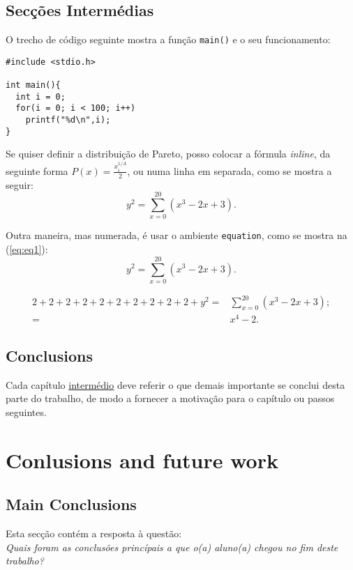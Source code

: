 \documentclass[titlepage,12pt,a4paper,times]{book}
\begin{document}
\section{Secções Intermédias}
\label{chap4:sec:...}

O trecho de código seguinte mostra a função \texttt{main()} e o seu
funcionamento:
\begin{lstlisting}[caption=Trecho de código usado no projeto.]
#include <stdio.h>

int main(){
  int i = 0;
  for(i = 0; i < 100; i++)
    printf("%d\n",i);
}
\end{lstlisting}

Se quiser definir a distribuição de Pareto, posso colocar a fórmula
\emph{inline}, da seguinte forma $P(x)=\frac{x^{1/\Lambda}_{i}}{2}$, ou numa
linha em separada, como se mostra a seguir:
$$ y^2 = \sum_{x=0}^{20}( x^3 - 2x + 3).$$

Outra maneira, mas numerada, é usar o ambiente \texttt{equation}, como se
mostra na (\ref{eq:eq1}):
\begin{equation}
 y^2 = \sum_{x=0}^{20}( x^3 - 2x + 3).
 \label{eq:eq1}
\end{equation}

\begin{align}
 2+2+2+2+2+2+2+2+2+2+y^2 = & \sum_{x=0}^{20}( x^3 - 2x + 3);\\
                         = & x^4 -2.
 \label{eq:eq2}
\end{align}

\section{Conclusions}

\label{chap4:sec:concs}
Cada capítulo \underline{intermédio} deve referir o que demais importante se
conclui desta parte do trabalho, de modo a fornecer a motivação para o capítulo
ou passos seguintes.

\chapter{Conlusions and future work}
\label{chap:conc-future-work}

\section{Main Conclusions}
\label{sec:main-conc}

Esta secção contém a resposta à questão: \\
\emph{Quais foram as conclusões princípais a que o(a) aluno(a) chegou no fim
deste trabalho?}
\end{document}
